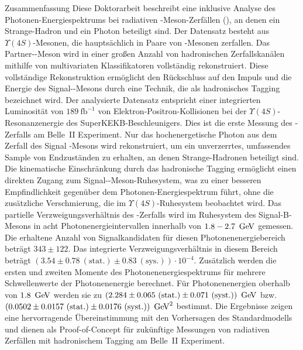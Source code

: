     \begin{abstractpage}{Zusammenfassung}
        \sloppy
        Diese Doktorarbeit beschreibt eine inklusive Analyse des Photonen-Energiespektrums bei radiativen \B-Meson-Zerfällen (\BtoXsgamma), an denen ein Strange-Hadron und ein Photon beteiligt sind.
        Der Datensatz besteht aus $\Upsilon(4S)$-Mesonen, die hauptsächlich in Paare von \B-Mesonen zerfallen.
        Das Partner-\B-Meson wird in einer großen Anzahl von hadronischen Zerfallskanälen mithilfe von multivariaten Klassifikatoren vollständig rekonstruiert. 
        Diese vollständige Rekonstruktion ermöglicht den Rückschluss auf den Impuls und die Energie des Signal-\B-Mesons durch eine Technik, die als hadronisches Tagging bezeichnet wird.
        Der analysierte Datensatz entspricht einer integrierten Luminosität von $189~\mathrm{fb}^{-1}$ von Elektron-Positron-Kollisionen bei der $\Upsilon(4S)$-Resonanzenergie des SuperKEKB-Beschleunigers. 
        Dies ist die erste Messung des \BtoXsgamma-Zerfalls am Belle~II Experiment.
        Nur das hochenergetische Photon aus dem Zerfall des Signal \B-Mesons wird rekonstruiert, um ein unverzerrtes, umfassendes Sample von Endzuständen zu erhalten, an denen Strange-Hadronen beteiligt sind. 
        Die kinematische Einschränkung durch das hadronische Tagging ermöglicht einen direkten Zugang zum Signal-\B-Meson-Ruhesystem, was zu einer besseren Empfindlichkeit gegenüber dem Photonen-Energiespektrum führt, ohne die zusätzliche Verschmierung, die im $\Upsilon(4S)$-Ruhesystem beobachtet wird.
        Das partielle Verzweigungsverh\"altnis des \BtoXsgamma-Zerfalls wird im Ruhesystem des Signal-B-Mesons in acht Photonenergieintervallen innerhalb von $1.8 - 2.7~\mathrm{\,Ge\kern -0.1em V}$ gemessen. 
        Die erhaltene Anzahl von Signalkandidaten für diesen Photonenenergiebereich beträgt $343 \pm 122$. 
        Das integrierte Verzweigungsverhältnis in diesem Bereich beträgt \mbox{$(3.54 \pm 0.78~(\mathrm{stat.}) \pm 0.83~(\mathrm{sys.}))\cdot10^{-4}$}.
        Zusätzlich werden die ersten und zweiten Momente des Photonenenergiespektrums für mehrere Schwellenwerte der Photonenenergie berechnet. 
        Für Photonenenergien oberhalb von $1.8~\mathrm{\,Ge\kern -0.1em V}$ werden sie zu \mbox{$(2.284 \pm 0.065~(\mathrm{stat.})\pm 0.071~(\mathrm{syst.}))~\mathrm{\,Ge\kern -0.1em V}$} bzw. \mbox{$(0.0502 \pm 0.0157~(\mathrm{stat.}) \pm 0.0176~(\mathrm{syst.}))~\mathrm{\,Ge\kern -0.1em V}^2$} bestimmt.
        Die Ergebnisse zeigen eine hervorragende Übereinstimmung mit den Vorhersagen des Standardmodells und dienen als Proof-of-Concept für zukünftige Messungen von radiativen \BtoXsgamma Zerfällen mit hadronischem Tagging am Belle~II Experiment.
    \end{abstractpage}
    